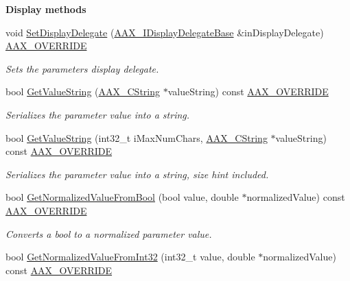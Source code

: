 \begin{Indent}\textbf{ Display methods}\par
\begin{DoxyCompactItemize}
\item 
void \mbox{\hyperlink{a01537_a75619ec0a487c28966dc5448e4d2ab05}{Set\+Display\+Delegate}} (\mbox{\hyperlink{a01797}{A\+A\+X\+\_\+\+I\+Display\+Delegate\+Base}} \&in\+Display\+Delegate) \mbox{\hyperlink{a00392_ac2f24a5172689ae684344abdcce55463}{A\+A\+X\+\_\+\+O\+V\+E\+R\+R\+I\+DE}}
\begin{DoxyCompactList}\small\item\em Sets the parameter\textquotesingle{}s display delegate. \end{DoxyCompactList}\item 
bool \mbox{\hyperlink{a01537_ae1dddbaf06ec0851dbf4eb09bad5b24f}{Get\+Value\+String}} (\mbox{\hyperlink{a01573}{A\+A\+X\+\_\+\+C\+String}} $\ast$value\+String) const \mbox{\hyperlink{a00392_ac2f24a5172689ae684344abdcce55463}{A\+A\+X\+\_\+\+O\+V\+E\+R\+R\+I\+DE}}
\begin{DoxyCompactList}\small\item\em Serializes the parameter value into a string. \end{DoxyCompactList}\item 
bool \mbox{\hyperlink{a01537_abd06be49094c789895adeb4ef11c4f9e}{Get\+Value\+String}} (int32\+\_\+t i\+Max\+Num\+Chars, \mbox{\hyperlink{a01573}{A\+A\+X\+\_\+\+C\+String}} $\ast$value\+String) const \mbox{\hyperlink{a00392_ac2f24a5172689ae684344abdcce55463}{A\+A\+X\+\_\+\+O\+V\+E\+R\+R\+I\+DE}}
\begin{DoxyCompactList}\small\item\em Serializes the parameter value into a string, size hint included. \end{DoxyCompactList}\item 
bool \mbox{\hyperlink{a01537_a67497b37e1a084d61a0e45601393a9cc}{Get\+Normalized\+Value\+From\+Bool}} (bool value, double $\ast$normalized\+Value) const \mbox{\hyperlink{a00392_ac2f24a5172689ae684344abdcce55463}{A\+A\+X\+\_\+\+O\+V\+E\+R\+R\+I\+DE}}
\begin{DoxyCompactList}\small\item\em Converts a bool to a normalized parameter value. \end{DoxyCompactList}\item 
bool \mbox{\hyperlink{a01537_a6caba47a6476f96bba38748c5df0da32}{Get\+Normalized\+Value\+From\+Int32}} (int32\+\_\+t value, double $\ast$normalized\+Value) const \mbox{\hyperlink{a00392_ac2f24a5172689ae684344abdcce55463}{A\+A\+X\+\_\+\+O\+V\+E\+R\+R\+I\+DE}}

\end{DoxyCompactItemize}
\end{Indent}
